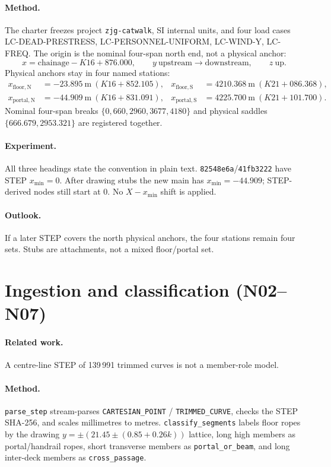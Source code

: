 \documentclass[11pt,a4paper]{article}
\begin{document}
\paragraph{Method.}
The charter freezes project \texttt{zjg-catwalk}, SI internal units, and four
load cases LC-DEAD-PRESTRESS, LC-PERSONNEL-UNIFORM, LC-WIND-Y, LC-FREQ. The
origin is the nominal four-span north end, not a physical anchor:
\[
x = \mathrm{chainage} - K16+876.000,\qquad
y\ \text{upstream}\to\text{downstream},\qquad
z\ \text{up}.
\]
Physical anchors stay in four named stations:
\begin{align*}
x_{\mathrm{floor,N}}&=-23.895~\mathrm{m}\ (K16+852.105),&
x_{\mathrm{floor,S}}&=4210.368~\mathrm{m}\ (K21+086.368),\\
x_{\mathrm{portal,N}}&=-44.909~\mathrm{m}\ (K16+831.091),&
x_{\mathrm{portal,S}}&=4225.700~\mathrm{m}\ (K21+101.700).
\end{align*}
Nominal four-span breaks \(\{0,660,2960,3677,4180\}\) and physical saddles
\(\{666.679,2953.321\}\) are registered together.

\paragraph{Experiment.}
All three headings state the convention in plain text.
\texttt{82548e6a}/\texttt{41fb3222} have STEP \(x_{\min}=0\). After drawing
stubs the new main has \(x_{\min}=-44.909\); STEP-derived nodes still start
at 0. No \(X-x_{\min}\) shift is applied.

\paragraph{Outlook.}
If a later STEP covers the north physical anchors, the four stations remain
four sets. Stubs are attachments, not a mixed floor/portal set.

\section{Ingestion and classification (N02--N07)}
\label{sec:ingest}

\paragraph{Related work.}
A centre-line STEP of 139\,991 trimmed curves is not a member-role model.

\paragraph{Method.}
\texttt{parse\_step} stream-parses \texttt{CARTESIAN\_POINT} /
\texttt{TRIMMED\_CURVE}, checks the STEP SHA-256, and scales millimetres to
metres. \texttt{classify\_segments} labels floor ropes by the drawing
\(y=\pm(21.45\pm(0.85+0.26k))\) lattice, long high members as portal/handrail
ropes, short transverse members as \texttt{portal\_or\_beam}, and long
inter-deck members as \texttt{cross\_passage}.
\end{document}
